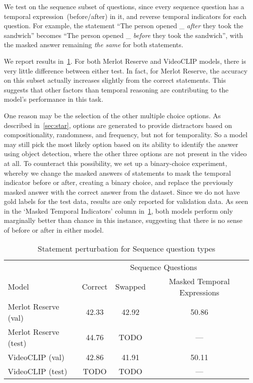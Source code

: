 We test on the sequence subset of questions, since every sequence question has
a temporal expression~(before/after) in it, and reverse temporal indicators for
each question. For example, the statement ``The person opened \_ \emph{after}
they took the sandwich'' becomes ``The person opened \_ \emph{before} they took
the sandwich'', with the masked answer remaining \emph{the same} for both
statements.

We report results in~\cref{tab:swap_star}. For both Merlot Reserve and
VideoCLIP models, there is very little difference between either test. In fact,
for Merlot Reserve, the accuracy on this subset actually increases slightly
from the correct statements. This suggests that other factors than temporal
reasoning are contributing to the model's performance in this task.

One reason may be the selection of the other multiple choice options. As
described in~\cref{sec:star}, options are generated to provide distractors
based on compositionality, randomness, and frequency, but not for temporality.
So a model may still pick the most likely option based on its ability to
identify the answer using object detection, where the other three options are
not present in the video at all. To counteract this possibility, we set up a
binary-choice experiment, whereby we change the masked answers of statements to
mask the temporal indicator before or after, creating a binary choice, and
replace the previously masked answer with the correct answer from the dataset.
Since we do not have gold labels for the test data, results are only reported
for validation data. As seen in the `Masked Temporal Indicators' column
in~\cref{tab:swap_star}, both models perform only marginally better than chance
in this instance, suggesting that there is no sense of before or after in
either model.

\begin{table}[tp]
    \centering
    \caption{Statement perturbation for Sequence question types}
    \label{tab:swap_star}
    \begin{tabular}{lccc}
        \toprule
        \multicolumn{1}{c}{}     & \multicolumn{3}{c}{Sequence Questions} \\
                                   \cmidrule(){2-4}
        Model          & Correct & Swapped & Masked Temporal Expressions\\
        \cmidrule(r){1-1} \cmidrule(){2-3} \cmidrule(l){4-4}
        Merlot Reserve (val)  & 42.33   & 42.92   & 50.86 \\
        Merlot Reserve (test) & 44.76   & TODO   & {---} \\
        VideoCLIP (val)       & 42.86   & 41.91   & 50.11 \\
        VideoCLIP (test)      & TODO   & TODO   &  {---} \\
        \bottomrule
    \end{tabular}
\end{table}


